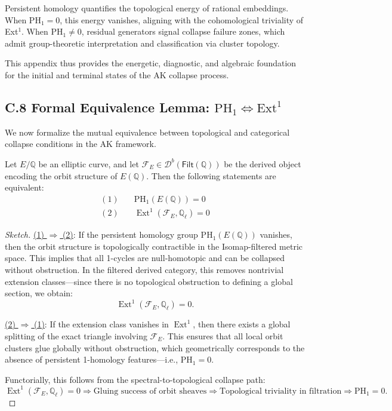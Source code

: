 Persistent homology quantifies the topological energy of rational embeddings.  
When \( \mathrm{PH}_1 = 0 \), this energy vanishes, aligning with the cohomological triviality of Ext$^1$.  
When \( \mathrm{PH}_1 \neq 0 \), residual generators signal collapse failure zones,  
which admit group-theoretic interpretation and classification via cluster topology.

This appendix thus provides the energetic, diagnostic, and algebraic foundation  
for the initial and terminal states of the AK collapse process.


\subsection*{C.8 Formal Equivalence Lemma: \texorpdfstring{$\mathrm{PH}_1 \Leftrightarrow \mathrm{Ext}^1$}{PH1 iff Ext1}}

We now formalize the mutual equivalence between topological and categorical collapse conditions in the AK framework.

\begin{lemma}
\label{lem:ph-ext-equiv}
Let \( E/\mathbb{Q} \) be an elliptic curve, and let \( \mathcal{F}_E \in \mathcal{D}^b(\mathsf{Filt}(\mathbb{Q})) \) be the derived object encoding the orbit structure of \( E(\mathbb{Q}) \).  
Then the following statements are equivalent:
\begin{align*}
\mathrm{(1)}\quad & \mathrm{PH}_1(E(\mathbb{Q})) = 0 \\
\mathrm{(2)}\quad & \operatorname{Ext}^1(\mathcal{F}_E, \mathbb{Q}_\ell) = 0
\end{align*}
\end{lemma}

\begin{proof}[Sketch]
\underline{(1) $\Rightarrow$ (2)}:  
If the persistent homology group \( \mathrm{PH}_1(E(\mathbb{Q})) \) vanishes, then the orbit structure is topologically contractible in the Isomap-filtered metric space.  
This implies that all 1-cycles are null-homotopic and can be collapsed without obstruction.  
In the filtered derived category, this removes nontrivial extension classes—since there is no topological obstruction to defining a global section, we obtain:
\[
\operatorname{Ext}^1(\mathcal{F}_E, \mathbb{Q}_\ell) = 0.
\]

\underline{(2) $\Rightarrow$ (1)}:  
If the extension class vanishes in \( \operatorname{Ext}^1 \), then there exists a global splitting of the exact triangle involving \( \mathcal{F}_E \).  
This ensures that all local orbit clusters glue globally without obstruction, which geometrically corresponds to the absence of persistent 1-homology features—i.e., \( \mathrm{PH}_1 = 0 \).

Functorially, this follows from the spectral-to-topological collapse path:
\[
\operatorname{Ext}^1(\mathcal{F}_E, \mathbb{Q}_\ell) = 0 
\Rightarrow \text{Gluing success of orbit sheaves} 
\Rightarrow \text{Topological triviality in filtration} 
\Rightarrow \mathrm{PH}_1 = 0.
\]
\end{proof}

